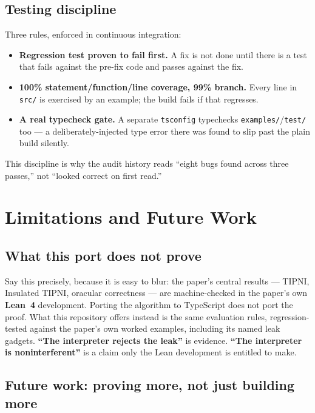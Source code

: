 \documentclass[11pt, a4paper]{article}
\begin{document}
\begin{descirption}
{\subsection{Testing discipline}

Three rules, enforced in continuous integration:

\begin{itemize}
  \item \textbf{Regression test proven to fail first.} A fix is not done
    until there is a test that fails against the pre-fix code and passes
    against the fix.
  \item \textbf{100\% statement/function/line coverage, 99\% branch.}
    Every line in \texttt{src/} is exercised by an example; the build
    fails if that regresses.
  \item \textbf{A real typecheck gate.} A separate \texttt{tsconfig}
    typechecks \texttt{examples/}/\texttt{test/} too --- a
    deliberately-injected type error there was found to slip past the
    plain build silently.
\end{itemize}

This discipline is why the audit history reads ``eight bugs found across
three passes,'' not ``looked correct on first read.''

\section{Limitations and Future Work}
\label{sec:limits}

\subsection{What this port does not prove}

Say this precisely, because it is easy to blur: the paper's central
results --- TIPNI, Insulated TIPNI, oracular correctness --- are
machine-checked in the paper's own \textbf{Lean~4} development. Porting
the algorithm to TypeScript does not port the proof. What this repository
offers instead is the same evaluation rules, regression-tested against
the paper's own worked examples, including its named leak gadgets.
\textbf{``The interpreter rejects the leak''} is evidence.
\textbf{``The interpreter is noninterferent''} is a claim only the Lean
development is entitled to make.

\subsection{Future work: proving more, not just building more}

}
\end{descirption}
\end{document}
